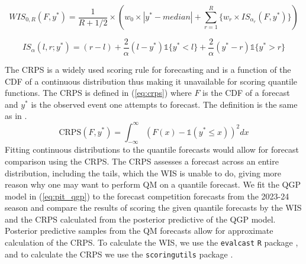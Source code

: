 \begin{equation}
\label{eq:wis}
        WIS_{0,R}(F, y^*) = \frac{1}{R + 1/2} \times 
        (w_0\times |y^* - median| + 
        \sum_{r=1}^R \{w_r \times IS_{\alpha_r}(F, y^*) \} )
\end{equation}

\begin{equation}
\label{eq:is}
        IS_{\alpha}(l,r;y^*) = (r-l) + 
        \frac{2}{\alpha}(l - y^*)\mathds{1}\{y^* < l\} + 
        \frac{2}{\alpha}(y^* - r) \mathds{1}\{y^* > r\}
\end{equation}

The CRPS is a widely used scoring rule for forecasting and is a function of the 
CDF of a continuous distribution thus making it unavailable for scoring 
quantile functions. The CRPS is defined in (\ref{eq:crps}) where $F$ is the 
CDF of a forecast and $y^*$ is the observed event one attempts to forecast. 
The definition is the same as in \cite{gneiting2014probabilistic}. 
\begin{equation}
    \label{eq:crps}
    \text{CRPS}(F, y^*) = \int_{-\infty}^{\infty} 
    (F(x) - \mathds{1} (y^* \leq x))^2 dx
\end{equation}
Fitting continuous distributions to the quantile forecasts would allow for 
forecast comparison using the CRPS. The CRPS assesses a forecast across an 
entire distribution, including the tails, which the WIS is unable to do, 
giving more reason why one may want to perform QM on a quantile forecast. 
We fit the QGP model in (\ref{eq:pit_qgp}) to the forecast competition 
forecasts from the 2023-24 season and compare the results of scoring the given 
quantile forecasts by the WIS and the CRPS calculated from the posterior 
predictive of the QGP model. Posterior predictive samples from the QM 
forecasts allow for approximate calculation of the CRPS. 
To calculate the WIS, we use the \texttt{evalcast} \texttt{R} package 
\cite[]{mcdonald2023evalcast}, and to calculate the CRPS we use the 
\texttt{scoringutils} package \cite[]{jordan2019scoringutils}.


